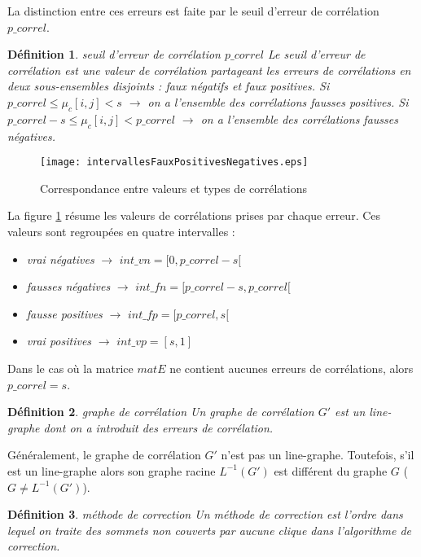 \documentclass[onecolumn, 12pt]{book}
\newtheorem{definition}{D\'efinition}
\begin{document}
\newline
La distinction entre ces erreurs est faite par le seuil d'erreur de corr\'elation $p\_correl$.
\begin{definition} {seuil d'erreur de corr\'elation $p\_correl$} \newline
Le seuil d'erreur de corr\'elation est une valeur de corr\'elation partageant les erreurs de corr\'elations en deux sous-ensembles disjoints : faux n\'egatifs et faux positives. \newline
Si  $p\_correl \le \mu_c[i,j]< s$ $\rightarrow$ on a l'ensemble des corr\'elations fausses positives. \newline
Si $p\_correl - s \le \mu_c[i,j]< p\_correl$ $\rightarrow$  on a l'ensemble des corr\'elations fausses n\'egatives.
\end{definition}

\begin{figure}[htb!] 
\centering
\texttt{[image: intervallesFauxPositivesNegatives.eps]}
\caption{ Correspondance entre valeurs et types de corr\'elations }
\label{intervallesFauxPositivesNegatives} 
\end{figure}

La figure \ref{intervallesFauxPositivesNegatives} r\'esume les valeurs de corr\'elations prises par chaque erreur. Ces valeurs sont regroup\'ees en quatre intervalles :
\begin{itemize}
\item {\em vrai n\'egatives} $\rightarrow$ $int\_vn = [0, p\_correl - s[$
\item {\em fausses n\'egatives} $\rightarrow$ $int\_fn = [p\_correl - s, p\_correl[$
\item {\em fausse positives} $\rightarrow$ $int\_fp = [p\_correl, s[$
\item {\em vrai positives} $\rightarrow$ $int\_vp = [s, 1]$
\end{itemize}
Dans le cas o\`u la matrice $matE$ ne contient aucunes erreurs de corr\'elations, alors $p\_correl = s$.

\begin{definition}{ graphe de corr\'elation } \newline
Un graphe de corr\'elation $G'$ est un line-graphe dont on a introduit des erreurs de corr\'elation.
\end{definition}
G\'en\'eralement, le graphe de corr\'elation $G'$ n'est pas  un line-graphe. Toutefois, s'il est un line-graphe alors son graphe racine $L^{-1}(G')$ est diff\'erent du graphe $G$ ($G \neq L^{-1}(G')$).
\begin{definition}{ m\'ethode de correction } \newline
Un m\'ethode de correction est l'ordre dans lequel on traite des sommets non couverts par aucune clique dans l'algorithme de correction.
\end{definition}
\end{document}
